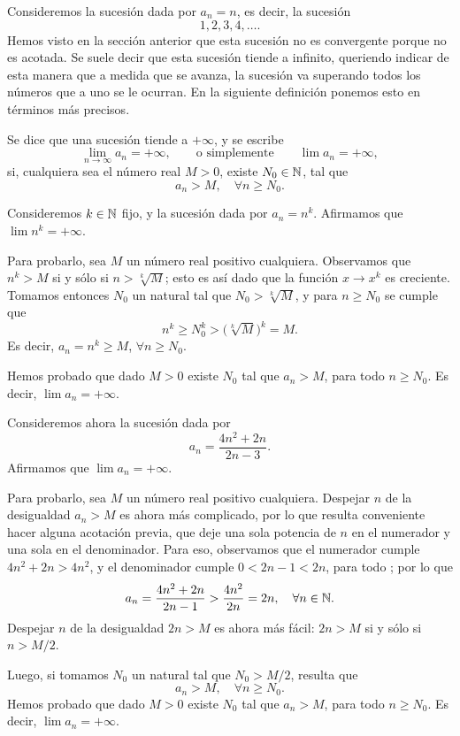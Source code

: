 Consideremos la sucesión dada por $a_n=n$, es decir, la sucesión
\[1, 2, 3, 4, \dots.\]
 Hemos visto en la sección anterior que esta sucesión no es convergente porque no es acotada. Se suele decir que esta sucesión tiende a infinito, queriendo indicar de esta manera que a medida que se avanza, la sucesión va superando todos los números que a uno se le ocurran. En la siguiente definición ponemos esto en términos más precisos.

 \begin{definition}
    Se dice que una sucesión \sucan tiende a $+\infty$, y se escribe
    \[
    \lim_{n\to\infty} a_n = +\infty,
    \qquad\text{o simplemente}\qquad
    \lim a_n = +\infty,
    \]
    si, cualquiera sea el número real $M>0$, existe $N_0\in\mathbb{N}$, tal que 
    \[ a_n>M, \quad\forall n\ge N_0.
    \]
 \end{definition}


\begin{example}
    Consideremos $k\in\mathbb{N}$ fijo, y la sucesión dada por $a_n=n^k$. Afirmamos que $\lim n^k = +\infty$.

    Para probarlo, sea $M$ un número real positivo cualquiera. 
    Observamos que $n^k > M$ si y sólo si $n > \sqrt[k]M$; esto es así dado que la función $x\to x^k$ es creciente. Tomamos entonces $N_0$ un natural tal que $N_0 > \sqrt[k]M$, y para $n\ge N_0$ se cumple que
    \[
    n^k \ge N_0^k > \big(\sqrt[k]M\big)^k = M.
    \]
    Es decir, $a_n=n^k \ge M$, $\forall n\ge N_0$.
    
    Hemos probado que dado $M>0$ existe $N_0$ tal que $a_n>M$, para todo $n\ge N_0$. Es decir, $\lim a_n = +\infty$.
\end{example}

\begin{example}
    Consideremos ahora la sucesión dada por 
    \[ 
    a_n=\frac{4n^2+2n}{2n-3}.
    \]
    Afirmamos que $\lim a_n = +\infty$.

    Para probarlo, sea $M$ un número real positivo cualquiera. 
    Despejar $n$ de la desigualdad $a_n>M$ es ahora más complicado, por lo que resulta conveniente hacer alguna acotación previa, que deje una sola potencia de $n$ en el numerador y una sola en el denominador. Para eso, observamos que el numerador cumple $4n^2+2n > 4n^2$, y el denominador cumple $0<2n-1 < 2n$, para todo \niN; por lo que
    \[
    a_n = \frac{4n^2+2n}{2n-1} > \frac{4n^2}{2n} = 2 n,\quad\forall {\ensuremath{n\in\mathbb{N}}}.
    \]
    Despejar $n$ de la desigualdad $2n>M$ es ahora más fácil: $2n>M$ si y sólo si $n>M/2$. 

    Luego, si tomamos $N_0$ un natural tal que $N_0>M/2$, resulta que
    \[
    a_n > M, \quad\forall n\ge N_0.
    \]
    Hemos probado que dado $M>0$ existe $N_0$ tal que $a_n>M$, para todo $n\ge N_0$. Es decir, $\lim a_n = +\infty$.
\end{example}


